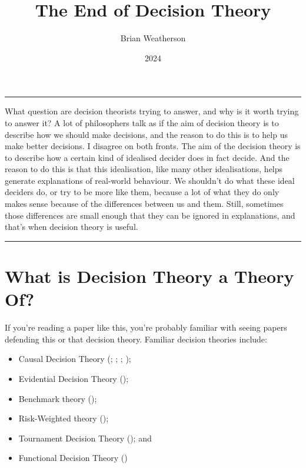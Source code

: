 \documentclass[
  10pt,
  letterpaper,
  DIV=11,
  numbers=noendperiod,
  twoside]{scrartcl}
\title{The End of Decision Theory}
\author{Brian Weatherson}
\date{2024}
\providecommand{\tightlist}{%
  \setlength{\itemsep}{0pt}\setlength{\parskip}{0pt}}\usepackage{longtable,booktabs,array}
\renewenvironment{abstract}
 {\vspace{-1.25cm}
 \quotation\small\noindent\rule{\linewidth}{.5pt}\par\smallskip
 \noindent }
 {\par\noindent\rule{\linewidth}{.5pt}\endquotation}
\begin{document}
\maketitle
\begin{abstract}
What question are decision theorists trying to answer, and why is it
worth trying to answer it? A lot of philosophers talk as if the aim of
decision theory is to describe how we should make decisions, and the
reason to do this is to help us make better decisions. I disagree on
both fronts. The aim of the decision theory is to describe how a certain
kind of idealised decider does in fact decide. And the reason to do this
is that this idealisation, like many other idealisations, helps generate
explanations of real-world behaviour. We shouldn't do what these ideal
deciders do, or try to be more like them, because a lot of what they do
only makes sense because of the differences between us and them. Still,
sometimes those differences are small enough that they can be ignored in
explanations, and that's when decision theory is useful.
\end{abstract}


\section{What is Decision Theory a Theory
Of?}\label{what-is-decision-theory-a-theory-of}

If you're reading a paper like this, you're probably familiar with
seeing papers defending this or that decision theory. Familiar decision
theories include:

\begin{itemize}
\tightlist
\item
  Causal Decision Theory (; ;
  ; );
\item
  Evidential Decision Theory ();
\item
  Benchmark theory ();
\item
  Risk-Weighted theory ();
\item
  Tournament Decision Theory (); and
\item
  Functional Decision Theory
  ()
\end{itemize}
\end{document}
